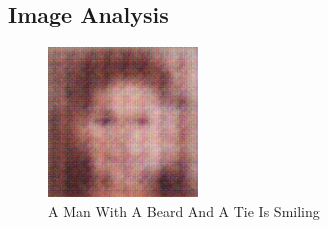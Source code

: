 \documentclass{article}%
\begin{document}
%
\subsection{Image Analysis}%
\label{subsec:ImageAnalysis}%


\begin{figure}[h!]%
\centering%
\includegraphics[width=150px]{500_fake_images/samples_5_446.png}%
\caption{A Man With A Beard And A Tie Is Smiling}%
\end{figure}

%
\end{document}
